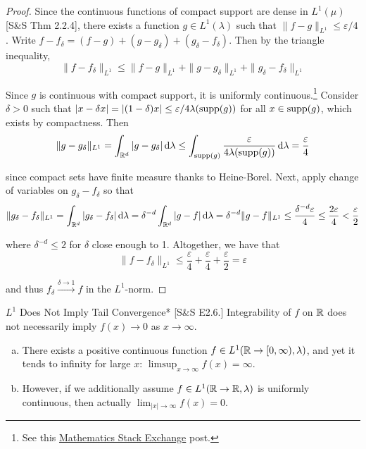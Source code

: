 \begin{proof}
    Since the continuous functions of compact support are dense in $L^1(\mu)$ [S\&S Thm 2.2.4], there exists a function $g \in L^1(\lambda)$ such that $\|f - g\|_{L^1} \leq \varepsilon / 4$. Write $f - f_{\delta} = (f-g) + (g-g_{\delta}) + (g_{\delta} - f_{\delta})$. Then by the triangle inequality, 
    $$
    \|f - f_{\delta}\|_{L^1} \leq \|f - g\|_{L^1} + \|g - g_{\delta}\|_{L^1} + \|g_{\delta} - f_{\delta}\|_{L^1}
    $$

    Since $g$ is continuous with compact support, it is uniformly continuous.\footnote{See this \href{https://math.stackexchange.com/questions/2086124/continuous-with-compact-support-implies-uniform-continuity}{Mathematics Stack Exchange} post.} Consider $\delta > 0$ such that $|x - \delta x| = |(1 - \delta)x| \leq \varepsilon / 4 \lambda(\operatorname{supp}(g))$ for all $x \in \operatorname{supp}(g)$, which exists by compactness. Then 
    $$
    \|g - g_{\delta}\|_{L^1} 
    = \int_{\mathbb{R}^d} |g - g_{\delta}| \, \mathrm{d}\lambda 
    \leq \int_{\operatorname{supp}(g)} \frac{\varepsilon}{4 \lambda(\operatorname{supp}(g))} \, \mathrm{d}\lambda
    = \frac{\varepsilon}{4}
    $$

    since compact sets have finite measure thanks to Heine-Borel. Next, apply change of variables on $g_{\delta} - f_{\delta}$ so that  
    $$
    \|g_{\delta} - f_{\delta}\|_{L^1}
    = \int_{\mathbb{R}^d} |g_{\delta} - f_{\delta}| \, \mathrm{d}\lambda 
    = \delta^{-d} \int_{\mathbb{R}^d} |g - f| \, \mathrm{d}\lambda
    = \delta^{-d} \|g - f\|_{L^1}
    \leq \frac{\delta^{-d} \varepsilon}{4}
    \leq \frac{2\varepsilon}{4}
    < \frac{\varepsilon}{2}
    $$

    where $\delta^{-d} \leq 2$ for $\delta$ close enough to 1. Altogether, we have that 
    $$
        \|f - f_{\delta}\|_{L^1} \leq \frac{\varepsilon}{4} + \frac{\varepsilon}{4} + \frac{\varepsilon}{2}
        = \varepsilon
    $$
    
    and thus $f_\delta \stackrel{\delta \to 1}{\longrightarrow} f$ in the $L^1$-norm. 
\end{proof}

\begin{problem}{$L^1$ Does Not Imply Tail Convergence}*
    [S\&S E2.6.] Integrability of $f$ on $\mathbb{R}$ does not necessarily imply $f(x) \to 0$ as $x \to \infty$. 
    \begin{enumerate}[(a)]
        \item There exists a positive continuous function $f \in L^1(\mathbb{R} \to [0, \infty), \lambda)$, and yet it tends to infinity for large $x$: $\limsup_{x \to \infty} f(x) = \infty$. 
        \item However, if we additionally assume $f \in L^1(\mathbb{R} \to \mathbb{R}, \lambda)$ is uniformly continuous, then actually $\lim_{|x| \to \infty} f(x) = 0$. 
    \end{enumerate}
\end{problem}

